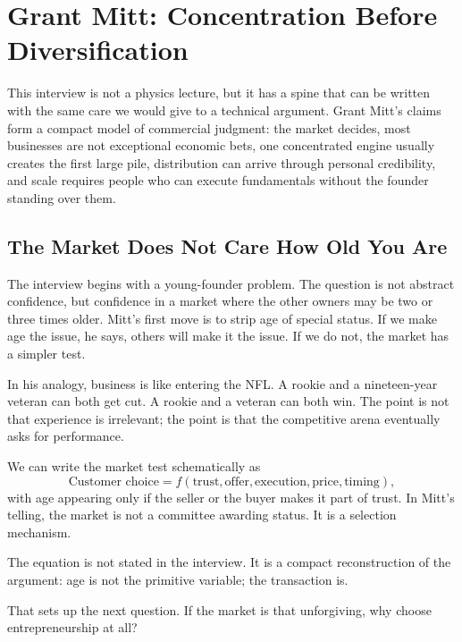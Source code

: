 \chapter{Grant Mitt: Concentration Before Diversification}

This interview is not a physics lecture, but it has a spine that can be written with the same care we would give to a technical argument. Grant Mitt's claims form a compact model of commercial judgment: the market decides, most businesses are not exceptional economic bets, one concentrated engine usually creates the first large pile, distribution can arrive through personal credibility, and scale requires people who can execute fundamentals without the founder standing over them.

\section{The Market Does Not Care How Old You Are}

The interview begins with a young-founder problem. The question is not abstract confidence, but confidence in a market where the other owners may be two or three times older. Mitt's first move is to strip age of special status. If we make age the issue, he says, others will make it the issue. If we do not, the market has a simpler test.

In his analogy, business is like entering the NFL. A rookie and a nineteen-year veteran can both get cut. A rookie and a veteran can both win. The point is not that experience is irrelevant; the point is that the competitive arena eventually asks for performance.

We can write the market test schematically as
\begin{equation}
\text{Customer choice} = f(\text{trust},\text{offer},\text{execution},\text{price},\text{timing}),
\end{equation}
with age appearing only if the seller or the buyer makes it part of trust. In Mitt's telling, the market is not a committee awarding status. It is a selection mechanism.

\begin{remark}
The equation is not stated in the interview. It is a compact reconstruction of the argument: age is not the primitive variable; the transaction is.
\end{remark}

That sets up the next question. If the market is that unforgiving, why choose entrepreneurship at all?

